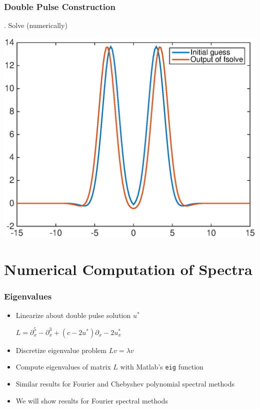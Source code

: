 \documentclass[16pt]{beamer}
\begin{document}
\begin{frame}
	\frametitle{Double Pulse Construction}
	\fontsize{16}{7.2}. Solve (numerically)
	\begin{center}
	\includegraphics[width=0.8\linewidth]{images/dp1after.eps}
	\end{center}
\end{frame}

\section{Numerical Computation of Spectra}

\begin{frame}
	\frametitle{Eigenvalues}
	\fontsize{16}{7.2}\selectfont
	\begin{itemize}
		\item Linearize about double pulse solution $u^*$
		\begin{center}
		$L = \partial_x^5 - \partial_x^3 + (c - 2 u^*)\partial_x - 2 u^*_x $
		\end{center}
		\item Discretize eigenvalue problem $Lv = \lambda v$
		\vspace{0.5cm}
		\item Compute eigenvalues of matrix $L$ with Matlab's \texttt{eig} function
		\vspace{0.5cm}
		\item Similar results for Fourier and Chebyshev polynomial spectral methods
		\vspace{0.5cm}
		\item We will show results for Fourier spectral methods
	\end{itemize}
\end{frame}
\end{document}

